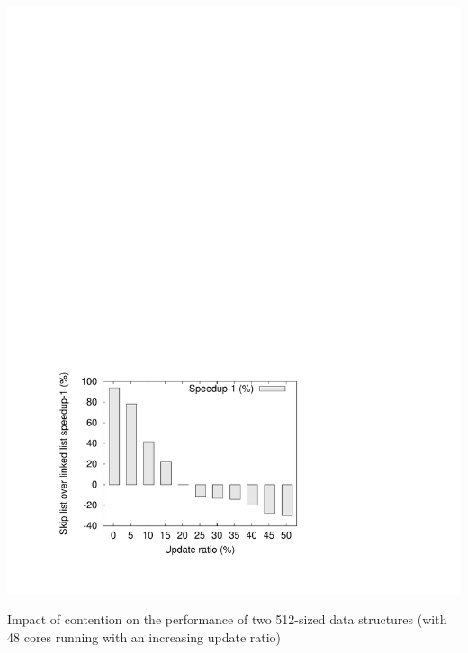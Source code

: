 \begin{floatingfigure}{7.5cm}
	\includegraphics[scale=0.575,clip=true,viewport=50 50 400 300]{CF-general/fig/example}
	\caption{{\footnotesize Impact of contention on the performance of two 512-sized data structures (with 48 cores running with an increasing update ratio)\label{fig:contention}}}
\end{floatingfigure}

